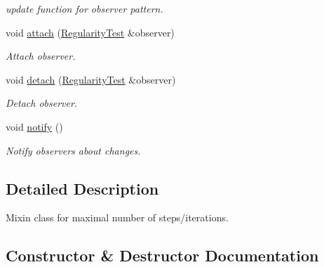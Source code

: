 \begin{DoxyCompactItemize}
\begin{DoxyCompactList}\small\item\em update function for observer pattern. \end{DoxyCompactList}\item 
void \hyperlink{classSpacy_1_1Mixin_1_1MixinConnection_abb5520ee6b22dd993d78f142939a1ed4}{attach} (\hyperlink{classSpacy_1_1Mixin_1_1RegularityTest}{Regularity\+Test} \&observer)\hypertarget{classSpacy_1_1Mixin_1_1MixinConnection_abb5520ee6b22dd993d78f142939a1ed4}{}\label{classSpacy_1_1Mixin_1_1MixinConnection_abb5520ee6b22dd993d78f142939a1ed4}

\begin{DoxyCompactList}\small\item\em Attach observer. \end{DoxyCompactList}\item 
void \hyperlink{classSpacy_1_1Mixin_1_1MixinConnection_adda739590c487679c26f60e50aedb73f}{detach} (\hyperlink{classSpacy_1_1Mixin_1_1RegularityTest}{Regularity\+Test} \&observer)\hypertarget{classSpacy_1_1Mixin_1_1MixinConnection_adda739590c487679c26f60e50aedb73f}{}\label{classSpacy_1_1Mixin_1_1MixinConnection_adda739590c487679c26f60e50aedb73f}

\begin{DoxyCompactList}\small\item\em Detach observer. \end{DoxyCompactList}\item 
void \hyperlink{classSpacy_1_1Mixin_1_1MixinConnection_a1ddeaa78a3bb4a38c2cca36d1f99fe36}{notify} ()\hypertarget{classSpacy_1_1Mixin_1_1MixinConnection_a1ddeaa78a3bb4a38c2cca36d1f99fe36}{}\label{classSpacy_1_1Mixin_1_1MixinConnection_a1ddeaa78a3bb4a38c2cca36d1f99fe36}

\begin{DoxyCompactList}\small\item\em Notify observers about changes. \end{DoxyCompactList}\end{DoxyCompactItemize}


\subsection{Detailed Description}
Mixin class for maximal number of steps/iterations. 

\subsection{Constructor \& Destructor Documentation}
